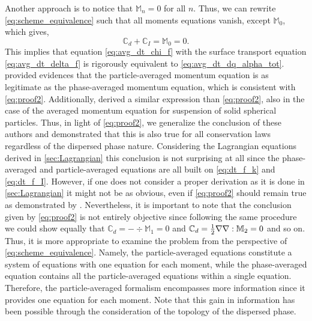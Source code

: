 Another approach is to notice that $\mathbb{M}_n=0$ for all $n$. Thus, we can rewrite \ref{eq:scheme_equivalence} such that all moments equations vanish, except $\mathbb{M}_0$, which gives, 
\begin{equation}
    \mathbb{C}_d 
    + \mathbb{C}_I
    = \mathbb{M}_0 = 0.
    \label{eq:proof2}
\end{equation}
This implies that equation \ref{eq:avg_dt_chi_f} with the surface transport equation \ref{eq:avg_dt_delta_f} is rigorously equivalent to \ref{eq:avg_dt_dq_alpha_tot}.
\citet[Appendix A]{zhang1997momentum} provided evidences that the particle-averaged momentum equation is as legitimate as the phase-averaged momentum equation, which is consistent with \ref{eq:proof2}. 
Additionally, \citet[Appendix A]{nott2011suspension} derived a similar expression than \ref{eq:proof2}, also in the case of the averaged momentum equation for suspension of solid spherical particles.
Thus, in light of \ref{eq:proof2}, we generalize the conclusion of these authors and demonstrated that this is also true for all conservation laws regardless of the dispersed phase nature.  
Considering the Lagrangian equations derived in \ref{sec:Lagrangian} this conclusion is not surprising at all since the phase-averaged and particle-averaged equations are all built on \ref{eq:dt_f_k} and \ref{eq:dt_f_I}.
However, if one does not consider a proper derivation as it is done in \ref{sec:Lagrangian} it might not be as obvious, even if \ref{eq:proof2} should remain true as demonstrated by \citet{zhang1997momentum,nott2011suspension}.
Nevertheless, it is important to note that the conclusion given by \ref{eq:proof2} is not entirely objective since following the same procedure we could show equally that $\mathbb{C}_d  = -\div\mathbb{M}_1=0$ and $\mathbb{C}_d  = \frac{1}{2}\mathbf{\nabla}\mathbf{\nabla}:\mathbb{M}_2=0$ and so on. 
Thus, it is more appropriate to examine the problem from the perspective of \ref{eq:scheme_equivalence}. 
Namely, the particle-averaged equations constitute a system of equations with one equation for each moment, while the phase-averaged equation contains all the particle-averaged equations within a single equation.
Therefore, the particle-averaged formalism encompasses more information since it provides one equation for each moment. 
Note that this gain in information has been possible through the consideration of the topology of the dispersed phase. 

